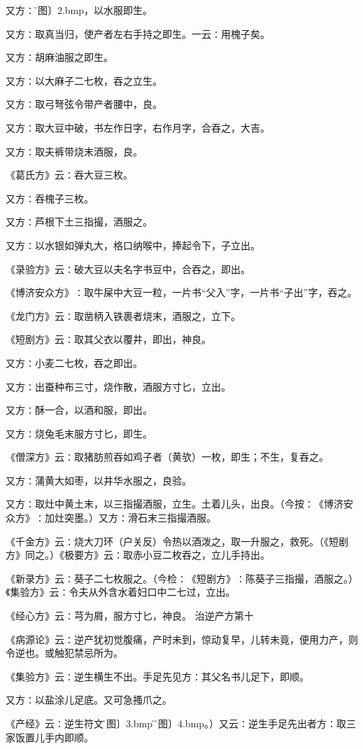 \documentclass[a4paper,12pt,UTF8,twoside]{ctexbook}
\begin{document}
又方∶\r〔图〕\pyxf2.bmp，以水服即生。

又方∶取真当归，使产者左右手持之即生。一云∶用槐子矣。

又方∶胡麻油服之即生。

又方∶以大麻子二七枚，吞之立生。

又方∶取弓弩弦令带产者腰中，良。

又方∶取大豆中破，书左作日字，右作月字，合吞之，大吉。

又方∶取夫裤带烧末酒服，良。

《葛氏方》云∶吞大豆三枚。

又方∶吞槐子三枚。

又方∶芦根下土三指撮，酒服之。

又方∶以水银如弹丸大，格口纳喉中，捧起令下，子立出。

《录验方》云∶破大豆以夫名字书豆中，合吞之，即出。

《博济安众方》∶取牛屎中大豆一粒，一片书“父入”字，一片书“子出”字，吞之。

《龙门方》云∶取凿柄入铁裹者烧末，酒服之，立下。

《短剧方》云∶取其父衣以覆井，即出，神良。

又方∶小麦二七枚，吞之即出。

又方∶出蚕种布三寸，烧作散，酒服方寸匕，立出。

又方∶酥一合，以酒和服，即出。

又方∶烧兔毛末服方寸匕，即生。

《僧深方》云∶取猪肪煎吞如鸡子者（黄欤）一枚，即生；不生，复吞之。

又方∶蒲黄大如枣，以井华水服之，良验。

又方∶取灶中黄土末，以三指撮酒服，立生。土着儿头，出良。（今按∶《博济安众方》∶加灶突墨。）又方∶滑石末三指撮酒服。

《千金方》云∶烧大刀环（户关反）令热以酒泼之，取一升服之，救死。（《短剧方》同之。）《极要方》云∶取赤小豆二枚吞之，立儿手持出。

《新录方》云∶葵子二七枚服之。（今检∶《短剧方》∶陈葵子三指撮，酒服之。）《集验方》云∶令夫从外含水着妇口中二七过，立出。

《经心方》云∶芎为屑，服方寸匕，神良。
治逆产方第十

《病源论》云∶逆产犹初觉腹痛，产时未到，惊动复早，儿转未竟，便用力产，则令逆也。或触犯禁忌所为。

《集验方》云∶逆生横生不出。手足先见方∶其父名书儿足下，即顺。

又方∶以盐涂儿足底。又可急搔爪之。

《产经》云∶逆生符文\r〔图〕\pyxf3.bmp\r（\r〔图〕\pyxf4.bmp。）又云∶逆生手足先出者方∶取三家饭置儿手内即顺。
\end{document}
